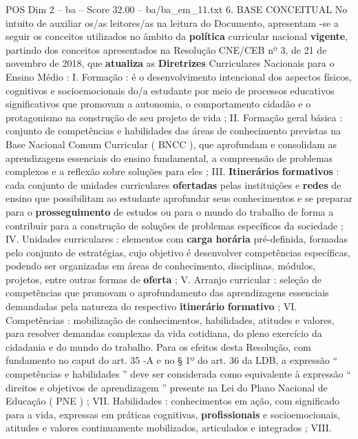 \begin{textsample}{POS Dim 2 – ba – Score 32.00 – ba/ba\_em\_11.txt}  \label{ex:f2_pos_034}
6.
BASE CONCEITUAL No intuito de auxiliar os/as leitores/as na leitura do Documento, apresentam -se a seguir os conceitos utilizados no âmbito da \textbf{política} curricular nacional \textbf{vigente}, partindo dos conceitos apresentados na Resolução CNE/CEB nº 3, de 21 de novembro de 2018, que \textbf{atualiza} as \textbf{Diretrizes} Curriculares Nacionais para o Ensino Médio : I.
Formação : é o desenvolvimento intencional dos aspectos físicos, cognitivos e socioemocionais do/a estudante por meio de processos educativos significativos que promovam a autonomia, o comportamento cidadão e o protagonismo na construção de seu projeto de vida ; II.
Formação geral básica : conjunto de competências e habilidades das áreas de conhecimento previstas na Base Nacional Comum Curricular ( BNCC ), que aprofundam e consolidam as aprendizagens essenciais do ensino fundamental, a compreensão de problemas complexos e a reflexão sobre soluções para eles ; III. \textbf{Itinerários} \textbf{formativos} : cada conjunto de unidades curriculares \textbf{ofertadas} pelas instituições e \textbf{redes} de ensino que possibilitam ao estudante aprofundar seus conhecimentos e se preparar para o \textbf{prosseguimento} de estudos ou para o mundo do trabalho de forma a contribuir para a construção de soluções de problemas específicos da sociedade ; IV.
Unidades curriculares : elementos com \textbf{carga} \textbf{horária} pré-definida, formadas pelo conjunto de estratégias, cujo objetivo é desenvolver competências específicas, podendo ser organizadas em áreas de conhecimento, disciplinas, módulos, projetos, entre outras formas de \textbf{oferta} ; V.
Arranjo curricular : seleção de competências que promovam o aprofundamento das aprendizagens essenciais demandadas pela natureza do respectivo \textbf{itinerário} \textbf{formativo} ; VI.
Competências : mobilização de conhecimentos, habilidades, atitudes e valores, para resolver demandas complexas da vida cotidiana, do pleno exercício da cidadania e do mundo do trabalho.
Para os efeitos desta Resolução, com fundamento no caput do art. 35 -A e no § 1º do art. 36 da LDB, a expressão “ competências e habilidades ” deve ser considerada como equivalente à expressão “ direitos e objetivos de aprendizagem ” presente na Lei do Plano Nacional de Educação ( PNE ) ; VII.
Habilidades : conhecimentos em ação, com significado para a vida, expressas em práticas cognitivas, \textbf{profissionais} e socioemocionais, atitudes e valores continuamente mobilizados, articulados e integrados ; VIII.

\end{textsample}
